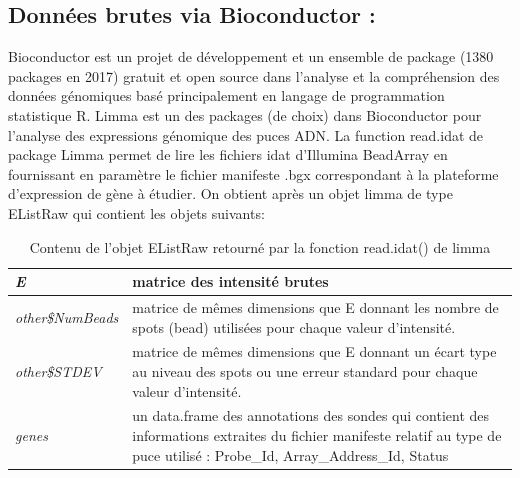 \documentclass[a4paper,10pt]{article}
\begin{document}
\subsection{ Données brutes via Bioconductor :}
Bioconductor est un projet de développement et un ensemble de package (1380 packages en 2017)  gratuit et open source dans l’analyse et la compréhension des données génomiques basé principalement en langage de programmation statistique R.
Limma est un des packages (de choix) dans Bioconductor pour l’analyse des expressions génomique des puces  ADN. La function read.idat de package Limma permet de lire les fichiers idat d’Illumina BeadArray en fournissant en paramètre le fichier manifeste .bgx correspondant à la plateforme d’expression de gène à étudier.
On obtient après un objet limma de type EListRaw  qui contient les objets suivants:
\begin{table}[!ht]
\begin{tabular}{|p{3cm}|p{9cm}|}
\hline
 \emph{E} & matrice des intensité brutes\\
\hline
\emph{other\$NumBeads }   &  matrice de mêmes dimensions que E donnant les nombre de spots (bead) utilisées pour chaque valeur d'intensité. \\
\hline 
\emph{other\$STDEV} & matrice de mêmes dimensions que E donnant un écart type au niveau des spots ou une erreur standard pour chaque valeur d'intensité.\\
\hline
\emph{genes} & un data.frame des annotations des sondes qui contient des informations extraites du fichier manifeste relatif au type de puce utilisé : Probe\_Id, Array\_Address\_Id, Status
\\
\hline
\end{tabular}
\caption{Contenu de l'objet EListRaw retourné par la fonction read.idat() de limma}
\label{EListRaw}
\end{table}
\end{document}
